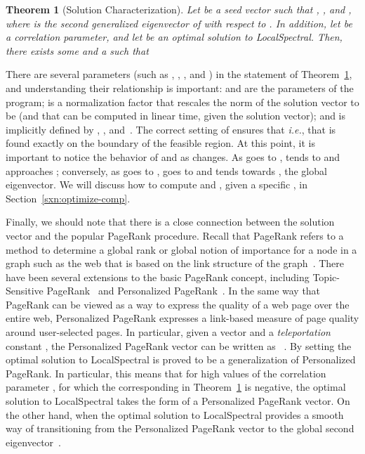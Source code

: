 \documentclass[11pt]{article}
\newtheorem{theorem}{Theorem}
\begin{document}
\begin{theorem}[Solution Characterization]
\label{thm:pagerank}
Let  be a seed vector such that , 
, and , where  is the second 
generalized eigenvector of  with respect to .
In addition, let  be a correlation parameter, and let
 be an optimal solution to \textsf{LocalSpectral}.
Then, there exists some  and a 
 such that 

\end{theorem}

\noindent
There are several parameters (such as , , , and ) in 
the statement of Theorem~\ref{thm:pagerank}, and understanding their 
relationship is important:
 and  are the parameters of the program;  is a normalization 
factor that rescales the norm of the solution vector to be  (and that can 
be computed in linear time, given the solution vector); and  is 
implicitly defined by , , and~. 
The correct setting of  ensures that 
 \emph{i.e.}, that  is found 
exactly on the boundary of the feasible region.
At this point, it is important to notice the behavior of  and 
 as  changes. 
As  goes to ,  tends to  and  
approaches ;
conversely, as  goes to ,   goes to  and 
 tends towards , the global eigenvector.
We will discuss how to compute  and , given a specific 
, in Section~\ref{sxn:optimize-comp}.

Finally, we should note that there is a close connection between the 
solution vector  and the popular PageRank procedure. 
Recall that PageRank refers to a method to determine a global rank or global 
notion of importance for a node in a graph such as the web that is based on 
the link structure of the graph~\cite{BP98,LM04,berkhin05_pagerank}. 
There have been several extensions to the basic PageRank concept, including 
Topic-Sensitive PageRank~\cite{haveliwala03_topicpr}
and Personalized PageRank~\cite{JW03}. 
In the same way that PageRank can be viewed as a way to express the quality 
of a web page over the entire web, Personalized PageRank expresses a 
link-based measure of page quality around user-selected pages.
In particular, given a vector  and a 
\emph{teleportation} constant , the Personalized PageRank vector 
can be written as
~\cite{andersen06local}.
By setting   the optimal solution to \textsf{LocalSpectral} is proved to 
be a generalization of Personalized PageRank. 
In particular, this means that for high values of the correlation parameter 
, for which the corresponding  in Theorem~\ref{thm:pagerank}
is negative, the optimal solution to \textsf{LocalSpectral} takes the form 
of a Personalized PageRank vector. 
On the other hand, when  the optimal solution to 
\textsf{LocalSpectral} provides a smooth way of transitioning from the 
Personalized PageRank vector to the global second eigenvector~.
\end{document}
